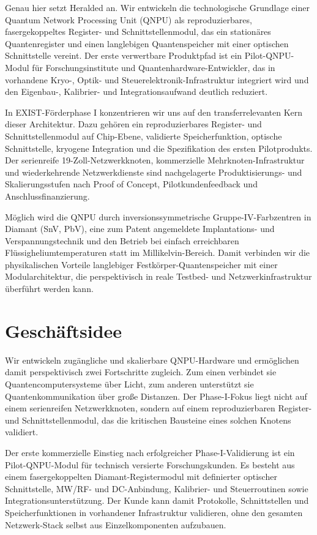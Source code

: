 \documentclass[11pt,oneside]{scrartcl}
\begin{document}
Genau hier setzt Heralded an. Wir entwickeln die technologische Grundlage einer Quantum Network Processing Unit (QNPU) als reproduzierbares, fasergekoppeltes Register- und Schnittstellenmodul, das ein station\"ares Quantenregister und einen langlebigen Quantenspeicher mit einer optischen Schnittstelle vereint. Der erste verwertbare Produktpfad ist ein Pilot-QNPU-Modul f\"ur Forschungsinstitute und Quantenhardware-Entwickler, das in vorhandene Kryo-, Optik- und Steuerelektronik-Infrastruktur integriert wird und den Eigenbau-, Kalibrier- und Integrationsaufwand deutlich reduziert.

In EXIST-F\"orderphase I konzentrieren wir uns auf den transferrelevanten Kern dieser Architektur. Dazu geh\"oren ein reproduzierbares Register- und Schnittstellenmodul auf Chip-Ebene, validierte Speicherfunktion, optische Schnittstelle, kryogene Integration und die Spezifikation des ersten Pilotprodukts. Der serienreife 19-Zoll-Netzwerkknoten, kommerzielle Mehrknoten-Infrastruktur und wiederkehrende Netzwerkdienste sind nachgelagerte Produktisierungs- und Skalierungsstufen nach Proof of Concept, Pilotkundenfeedback und Anschlussfinanzierung.

M\"oglich wird die QNPU durch inversionssymmetrische Gruppe-IV-Farbzentren in Diamant (SnV, PbV), eine zum Patent angemeldete Implantations- und Verspannungstechnik und den Betrieb bei einfach erreichbaren Fl\"ussigheliumtemperaturen statt im Millikelvin-Bereich. Damit verbinden wir die physikalischen Vorteile langlebiger Festk\"orper-Quantenspeicher mit einer Modularchitektur, die perspektivisch in reale Testbed- und Netzwerkinfrastruktur \"uberf\"uhrt werden kann.

\section{Gesch\"aftsidee}
Wir entwickeln zug\"angliche und skalierbare QNPU-Hardware und erm\"oglichen damit perspektivisch zwei Fortschritte zugleich. Zum einen verbindet sie Quantencomputersysteme \"uber Licht, zum anderen unterst\"utzt sie Quantenkommunikation \"uber gro\ss e Distanzen. Der Phase-I-Fokus liegt nicht auf einem serienreifen Netzwerkknoten, sondern auf einem reproduzierbaren Register- und Schnittstellenmodul, das die kritischen Bausteine eines solchen Knotens validiert.

Der erste kommerzielle Einstieg nach erfolgreicher Phase-I-Validierung ist ein Pilot-QNPU-Modul f\"ur technisch versierte Forschungskunden. Es besteht aus einem fasergekoppelten Diamant-Registermodul mit definierter optischer Schnittstelle, MW/RF- und DC-Anbindung, Kalibrier- und Steuerroutinen sowie Integrationsunterst\"utzung. Der Kunde kann damit Protokolle, Schnittstellen und Speicherfunktionen in vorhandener Infrastruktur validieren, ohne den gesamten Netzwerk-Stack selbst aus Einzelkomponenten aufzubauen.
\end{document}

